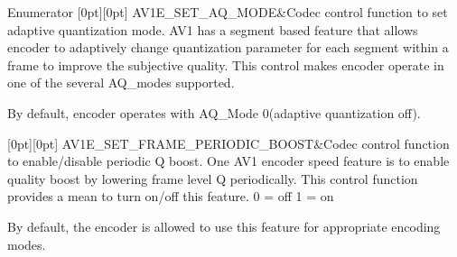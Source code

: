 \begin{DoxyEnumFields}{Enumerator}
[0pt][0pt]{}\mbox{\label{group__aom__encoder_ggae78dde67a6d78f332e9bdba0dde42db5a17bd297efc31082157785d68fc5a6067}} 
A\+V1\+E\+\_\+\+S\+E\+T\+\_\+\+A\+Q\+\_\+\+M\+O\+DE&Codec control function to set adaptive quantization mode. A\+V1 has a segment based feature that allows encoder to adaptively change quantization parameter for each segment within a frame to improve the subjective quality. This control makes encoder operate in one of the several A\+Q\+\_\+modes supported.

By default, encoder operates with A\+Q\+\_\+\+Mode 0(adaptive quantization off). \\
\hline

[0pt][0pt]{}\mbox{\label{group__aom__encoder_ggae78dde67a6d78f332e9bdba0dde42db5a737368591a37417b108c0706f7510885}} 
A\+V1\+E\+\_\+\+S\+E\+T\+\_\+\+F\+R\+A\+M\+E\+\_\+\+P\+E\+R\+I\+O\+D\+I\+C\+\_\+\+B\+O\+O\+ST&Codec control function to enable/disable periodic Q boost. One A\+V1 encoder speed feature is to enable quality boost by lowering frame level Q periodically. This control function provides a mean to turn on/off this feature. 0 = off 1 = on

By default, the encoder is allowed to use this feature for appropriate encoding modes. \\
\hline


\end{DoxyEnumFields}

